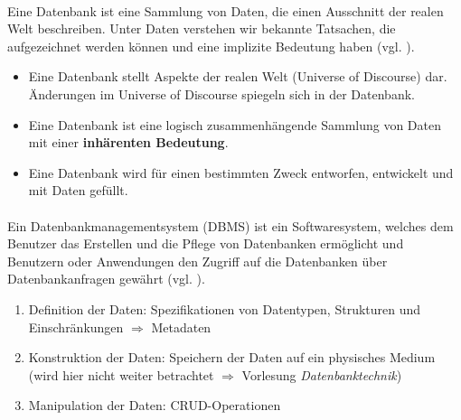 \begin{frame}{\insertsection}
	\framesubtitle{\insertsubsection}
	\begin{definition}[Datenbank]
		Eine Datenbank ist eine Sammlung von Daten, die einen Ausschnitt der realen Welt beschreiben. Unter Daten verstehen 
		wir bekannte Tatsachen, die aufgezeichnet werden können und eine implizite Bedeutung haben  (vgl. \cite[S. 4]{EN10}).
	\end{definition}
  \abs\onslide\pause
	\begin{itemize}
		\item Eine Datenbank stellt Aspekte der realen Welt (Universe of Discourse) dar. Änderungen im Universe of Discourse spiegeln sich in der Datenbank.
		\item Eine Datenbank ist eine logisch zusammenhängende Sammlung von Daten mit einer \textbf{inhärenten Bedeutung}.
		\item Eine Datenbank wird für einen bestimmten Zweck entworfen, entwickelt und mit Daten gefüllt.
	\end{itemize}
\end{frame}


\begin{frame}{\insertsection}
	\framesubtitle{\insertsubsection}
	\begin{definition}[Datenbankmanagementsystem]
		Ein Datenbankmanagementsystem (DBMS) ist ein Softwaresystem, welches dem Benutzer das Erstellen und die Pflege von Datenbanken 
		erm\"oglicht und Benutzern oder Anwendungen den Zugriff auf die Datenbanken \"uber Datenbankanfragen gew\"ahrt 
		(vgl. \cite[S. 5]{EN10}).
	\end{definition}
  \abs\onslide\pause 
	\begin{enumerate}
		\item Definition der Daten: Spezifikationen von Datentypen, Strukturen und Einschränkungen $\Rightarrow$ Metadaten
		\item Konstruktion der Daten: Speichern der Daten auf ein physisches Medium 
		(wird hier nicht weiter betrachtet $\Rightarrow$ Vorlesung \textit{Datenbanktechnik})
		\item Manipulation der Daten: CRUD-Operationen
	\end{enumerate}	
\end{frame}

	
